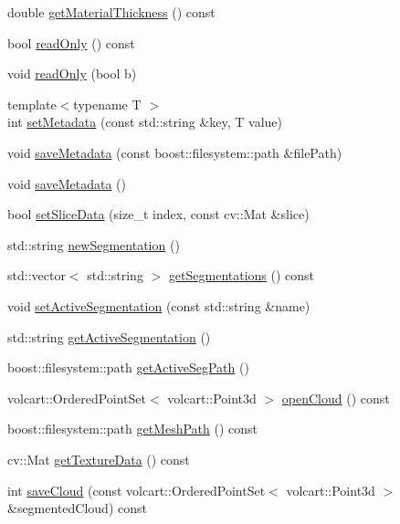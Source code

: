 \begin{DoxyCompactItemize}
double \hyperlink{classVolumePkg_a84a0f3f538667094dc498124f0eb548c}{get\+Material\+Thickness} () const
\item 
bool \hyperlink{classVolumePkg_a1cf5ee88ba2392ab825619ef7890d7ae}{read\+Only} () const
\item 
void \hyperlink{classVolumePkg_a4dba1fc88e4390da1ad9fadf4c73b41b}{read\+Only} (bool b)
\item 
{\footnotesize template$<$typename T $>$ }\\int \hyperlink{classVolumePkg_a560d401f04a486c0277e37b3e2607886}{set\+Metadata} (const std\+::string \&key, T value)
\item 
void \hyperlink{classVolumePkg_abdccc4c348d57a7ea84a65c48ee50c75}{save\+Metadata} (const boost\+::filesystem\+::path \&file\+Path)
\item 
void \hyperlink{classVolumePkg_a49a81e85ddb0fb188efdeb357592b99f}{save\+Metadata} ()
\item 
bool \hyperlink{classVolumePkg_a8d062ac46538de627f67f56ab35d6943}{set\+Slice\+Data} (size\+\_\+t index, const cv\+::\+Mat \&slice)
\item 
std\+::string \hyperlink{classVolumePkg_ae57e71436c7e3c4db73be88b49924637}{new\+Segmentation} ()
\item 
std\+::vector$<$ std\+::string $>$ \hyperlink{classVolumePkg_a1fe0966da96333797dc6be5045766148}{get\+Segmentations} () const
\item 
void \hyperlink{classVolumePkg_a8b1fa5d3ca58dbd22ac1a576971bc7a0}{set\+Active\+Segmentation} (const std\+::string \&name)
\item 
std\+::string \hyperlink{classVolumePkg_ab603499204250e15b5532acb51e750d6}{get\+Active\+Segmentation} ()
\item 
boost\+::filesystem\+::path \hyperlink{classVolumePkg_a7af137a5ab84ca0b945faef2adf2a75f}{get\+Active\+Seg\+Path} ()
\item 
volcart\+::\+Ordered\+Point\+Set$<$ volcart\+::\+Point3d $>$ \hyperlink{classVolumePkg_a6948e4fed7d29257efa5752b25c8f877}{open\+Cloud} () const
\item 
boost\+::filesystem\+::path \hyperlink{classVolumePkg_a07589ed2f04df55a01be45fe1f5dc87f}{get\+Mesh\+Path} () const
\item 
cv\+::\+Mat \hyperlink{classVolumePkg_abb42726353738af10e922d0ef41406d6}{get\+Texture\+Data} () const
\item 
int \hyperlink{classVolumePkg_ad8e7c0e7bf2ae1b6771533fe60e91625}{save\+Cloud} (const volcart\+::\+Ordered\+Point\+Set$<$ volcart\+::\+Point3d $>$ \&segmented\+Cloud) const

\end{DoxyCompactItemize}
